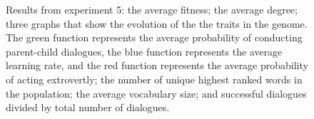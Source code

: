 \begin{figure}[b]\setcounter{subfigure}{0}
    \centering
    \hfill
    \caption[Graphs of the results from experiment 5 as a function of number of generations.]{Results from experiment 5:  the average fitness;  the average degree;  three graphs that show the evolution of the the traits in the genome. The green function represents the average probability of conducting parent-child dialogues, the blue function represents the average learning rate, and the red function represents the average probability of acting extrovertly;  the number of unique highest ranked words in the population;  the average vocabulary size; and  successful dialogues divided by total number of dialogues.}
    \label{fig:exp5.0}
\end{figure}
%
